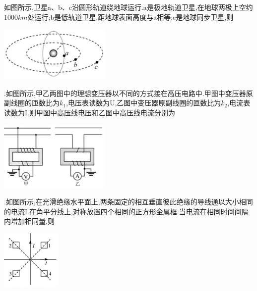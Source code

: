 \question[6]如图所示,卫星a、b、c沿圆形轨道绕地球运行.a是极地轨道卫星,在地球两极上空约$1000km$处运行;b是低轨道卫星,距地球表面高度与a相等;c是地球同步卫星,则\key{}\begin{center}\includegraphics[]{img/image6.png}\end{center}
\begin{solution}{4cm}

\end{solution}



\question[6].如图所示,甲乙两图中的理想变压器以不同的方式接在高压电路中.甲图中变压器原副线圈的匝数比为$k_1$,电压表读数为U,乙图中变压器原副线圈的匝数比为$k_2$,电流表读数为I.则甲图中高压线电压和乙图中高压线电流分别为\key{}\begin{center}\includegraphics[]{img/image7.png}\end{center}
\begin{solution}{4cm}

\end{solution}



\question[6].如图所示,在光滑绝缘水平面上,两条固定的相互垂直彼此绝缘的导线通以大小相同的电流I.在角平分线上,对称放置四个相同的正方形金属框.当电流在相同时间间隔内增加相同量,则\key{}\begin{center}\includegraphics[]{img/image8.png}\end{center}
\begin{solution}{4cm}

\end{solution}



